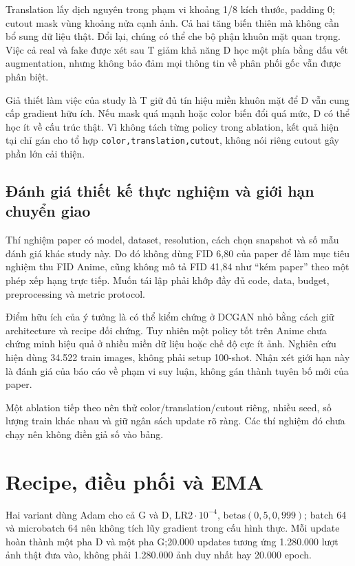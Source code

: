 \documentclass[11pt,a4paper]{article}
\begin{document}
Translation lấy dịch nguyên trong phạm vi khoảng 1/8 kích thước, padding 0; cutout mask vùng khoảng nửa cạnh ảnh. Cả hai tăng biến thiên mà không cần bổ sung dữ liệu thật. Đổi lại, chúng có thể che bộ phận khuôn mặt quan trọng. Việc cả real và fake được xét sau T giảm khả năng D học một phía bằng dấu vết augmentation, nhưng không bảo đảm mọi thông tin về phân phối gốc vẫn được phân biệt.

Giả thiết làm việc của study là T giữ đủ tín hiệu miền khuôn mặt để D vẫn cung cấp gradient hữu ích. Nếu mask quá mạnh hoặc color biến đổi quá mức, D có thể học ít về cấu trúc thật. Vì không tách từng policy trong ablation, kết quả hiện tại chỉ gán cho tổ hợp \texttt{color,translation,cutout}, không nói riêng cutout gây phần lớn cải thiện.

\subsection{Đánh giá thiết kế thực nghiệm và giới hạn chuyển giao}
Thí nghiệm paper có model, dataset, resolution, cách chọn snapshot và số mẫu đánh giá khác study này. Do đó không dùng FID 6,80 của paper để làm mục tiêu nghiệm thu FID Anime, cũng không mô tả FID 41,84 như ``kém paper'' theo một phép xếp hạng trực tiếp. Muốn tái lập phải khớp đầy đủ code, data, budget, preprocessing và metric protocol.

Điểm hữu ích của ý tưởng là có thể kiểm chứng ở DCGAN nhỏ bằng cách giữ architecture và recipe đối chứng. Tuy nhiên một policy tốt trên Anime chưa chứng minh hiệu quả ở nhiều miền dữ liệu hoặc chế độ cực ít ảnh. Nghiên cứu hiện dùng 34.522 train images, không phải setup 100-shot. Nhận xét giới hạn này là đánh giá của báo cáo về phạm vi suy luận, không gán thành tuyên bố mới của paper.

Một ablation tiếp theo nên thử color/translation/cutout riêng, nhiều seed, số lượng train khác nhau và giữ ngân sách update rõ ràng. Các thí nghiệm đó chưa chạy nên không điền giả số vào bảng.
\clearpage

\section{Recipe, điều phối và EMA}\label{sec:training}
Hai variant dùng Adam cho cả G và D, LR$2\cdot 10^{-4}$, betas$(0{,}5,0{,}999)$; batch 64 và microbatch 64 nên không tích lũy gradient trong cấu hình thực. Mỗi update hoàn thành một pha D và một pha G;20.000 updates tương ứng 1.280.000 lượt ảnh thật đưa vào, không phải 1.280.000 ảnh duy nhất hay 20.000 epoch.
\end{document}
